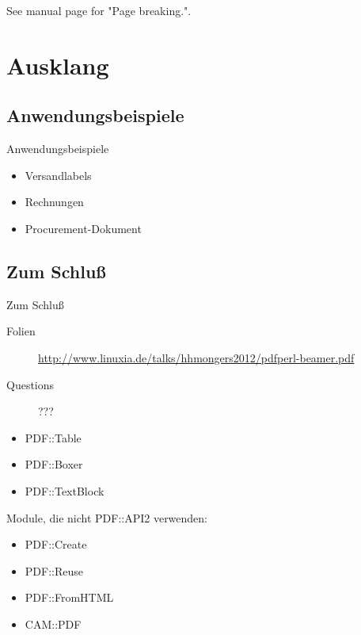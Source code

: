 See manual page for "Page breaking.".


\section{Ausklang}

\subsection{Anwendungsbeispiele}
\begin{frame}{Anwendungsbeispiele}
 \begin{itemize}
  \item Versandlabels
  \item Rechnungen
  \item Procurement-Dokument
  \end{itemize}
\end{frame}

\subsection{Zum Schluß}
\begin{frame}{Zum Schluß}
 \begin{description}
  \item[Folien]
    \url{http://www.linuxia.de/talks/hhmongers2012/pdfperl-beamer.pdf}
   \item[Questions] ???
 \end{description}
\end{frame}

\begin{itemize}
\item PDF::Table
\item PDF::Boxer
\item PDF::TextBlock
\end{itemize}

Module, die nicht PDF::API2 verwenden:

\begin{itemize}
\item PDF::Create
\item PDF::Reuse
\item PDF::FromHTML
\item CAM::PDF
\end{itemize}




